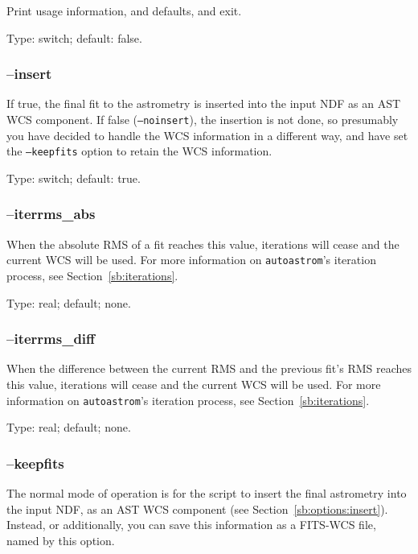\documentclass[twoside,11pt,nolof]{starlink}
\providecommand{\autoastrom}{\texttt{autoastrom}}
\begin{document}
Print usage information, and defaults, and exit.

Type: switch; default: false.

\subsubsection{--insert\label{sb:options:insert}}

If true, the final fit to the astrometry is inserted into the input NDF as an
AST WCS component.  If false (\texttt{--noinsert}), the insertion is not done,
so presumably you have decided to handle the WCS information in a different
way, and have set the \texttt{--keepfits} option to retain the WCS
information.

Type: switch; default: true.

\subsubsection{--iterrms\_abs\label{sb:options:iterrms_abs}}

When the absolute RMS of a fit reaches this value, iterations will cease and
the current WCS will be used. For more information on \autoastrom's iteration
process, see Section~\ref{sb:iterations}.

Type: real; default; none.

\subsubsection{--iterrms\_diff\label{sb:options:iterrms_diff}}

When the difference between the current RMS and the previous fit's RMS reaches
this value, iterations will cease and the current WCS will be used. For more
information on \autoastrom's iteration process, see
Section~\ref{sb:iterations}.

Type: real; default; none.

\subsubsection{--keepfits\label{sb:options:keepfits}}

The normal mode of operation is for the script to insert the final astrometry
into the input NDF, as an AST WCS component (see
Section~\ref{sb:options:insert}).  Instead, or additionally, you can save this
information as a FITS-WCS file, named by this option.
\end{document}
